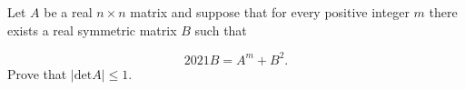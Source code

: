 Let \(A\) be a real \(n \times n\) matrix and suppose that for every positive integer \(m\) there exists a real symmetric matrix \(B\) such that

\[2021B = A^m+B^2.\]
Prove that \(|\text{det} A| \leq 1\).